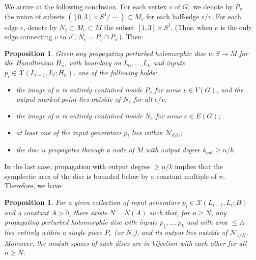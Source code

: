\documentclass[11pt,leqno]{amsart}
\newtheorem{prop}[theo]{Proposition}
\numberwithin{equation}{section}
\newcommand{\cN}{{\mathcal N}}
\newcommand{\cX}{{\mathcal X}}
\begin{document}
We arrive at the following conclusion. For each vertex $v$ of $G,$ we denote by $P_v$ the union of subsets $([0,3]\times S^1/\sim)\subset M_e$ for each half-edge $e/v.$
For each edge $e$, denote by $N_e\subset M_e\subset M$ the subset $[1,3]\times S^1$.
(Thus, when $e$ is the only edge connecting $v$ to $v'$, $N_e=P_v\cap P_{v'}$).
Then:

\begin{prop}\label{prop:hlee}
Given any propagating perturbed holomorphic disc $u:S\to M$ for the
Hamiltonian $H_n$, with boundary on $L_0,\dots,L_k$ and inputs $p_i\in
\cX(L_{i-1},L_i;H_n)$, one of the following holds:
\begin{itemize}
\item the image of $u$ is entirely contained inside $P_v$ for some $v\in V(G)$,
and the output marked point lies outside of $N_e$ for all $e/v$;
\item the image of $u$ is entirely contained inside $N_e$ for some $e\in
E(G)$;
\item at least one of the input generators $p_i$ lies within $\cN_{k/n}$;
\item the disc $u$ propagates through a node of $M$ with output
degree $k_{out}\geq n/k$.
\end{itemize}
\end{prop}

In the last case, propagation with output degree $\geq n/k$ implies that the
symplectic area of the disc is bounded below by a constant
multiple of $n$. Therefore, we have: 

\begin{prop} \label{prop:lowarealocal}
For a given collection of input generators $p_i\in
\cX(L_{i-1},L_i;H)$ and a constant $A>0$, there exists $N=N(A)$ such that,
for $n\geq N$, any propagating perturbed holomorphic disc with inputs
$p_1,\dots,p_k$ and with area $\leq A$ lies entirely within a single piece
$P_v$ (or $N_e$), and its output lies outside of $\cN_{1/N}$.
Moreover, the moduli spaces of such discs are in bijection with each other for all
$n\geq N$.\end{prop}
\end{document}
